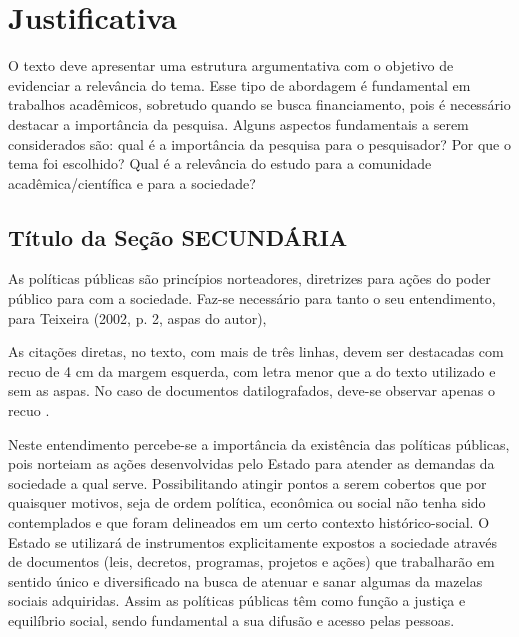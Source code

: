 \chapter{Justificativa} \label{cha:fundamentacao}

O texto deve apresentar uma estrutura argumentativa com o objetivo de evidenciar a relevância do tema. Esse tipo de abordagem é fundamental em trabalhos acadêmicos, sobretudo quando se busca financiamento, pois é necessário destacar a importância da pesquisa. Alguns aspectos fundamentais a serem considerados são: qual é a importância da pesquisa para o pesquisador? Por que o tema foi escolhido? Qual é a relevância do estudo para a comunidade acadêmica/científica e para a sociedade?

\section{Título da Seção SECUNDÁRIA}
As políticas públicas são princípios norteadores, diretrizes para ações do 
poder público para com a sociedade. Faz-se necessário para tanto o seu 
entendimento, para Teixeira (2002, p. 2, aspas do autor),

\begin{citacao}
As citações diretas, no texto, com mais de três linhas, devem ser
destacadas com recuo de 4 cm da margem esquerda, com letra menor que a do texto
utilizado e sem as aspas. No caso de documentos datilografados, deve-se
observar apenas o recuo \cite[5.3]{NBR10520:2002}.
\end{citacao}

Neste entendimento percebe-se a importância da existência das políticas 
públicas, pois norteiam as ações desenvolvidas pelo Estado para atender as 
demandas da sociedade a qual serve. Possibilitando atingir pontos a serem cobertos 
que por quaisquer motivos, seja de ordem política, econômica ou social não tenha 
sido contemplados e que foram delineados em um certo contexto histórico-social. O 
Estado se utilizará de instrumentos explicitamente expostos a sociedade através de 
documentos (leis, decretos, programas, projetos e ações) que trabalharão em 
sentido único e diversificado na busca de atenuar e sanar algumas da mazelas 
sociais adquiridas. Assim as políticas públicas têm como função a justiça e equilíbrio 
social, sendo fundamental a sua difusão e acesso pelas pessoas. 


